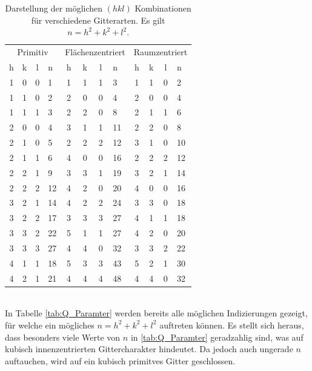 \documentclass[a4paper,twoside,final]{article}
\begin{document}
\begin{table}[ht]
	\centering
	\caption{Darstellung der möglichen $(hkl)$ Kombinationen für verschiedene Gitterarten. Es gilt $n = h^2+k^2+l^2$.}
	\label{tab:Indizierung}
	\begin{tabular}{c c c l c c c l c c c l}
		\toprule
      \multicolumn{4}{c}{Primitiv} & \multicolumn{4}{c}{Flächenzentriert} & \multicolumn{4}{c}{Raumzentriert}\\
      \cmidrule(lr){1-4}\cmidrule(lr){5-8}\cmidrule(lr){9-12}
      h & k & l & n & h & k & l & n & h & k & l & n \\
      \midrule
      1 & 0 & 0 & 1   & 1 & 1 & 1 & 3   & 1 & 1 & 0 & 2   \\
      1 & 1 & 0 & 2   & 2 & 0 & 0 & 4   & 2 & 0 & 0 & 4   \\
      1 & 1 & 1 & 3   & 2 & 2 & 0 & 8   & 2 & 1 & 1 & 6   \\
      2 & 0 & 0 & 4   & 3 & 1 & 1 & 11  & 2 & 2 & 0 & 8   \\
      2 & 1 & 0 & 5   & 2 & 2 & 2 & 12  & 3 & 1 & 0 & 10  \\
      2 & 1 & 1 & 6   & 4 & 0 & 0 & 16  & 2 & 2 & 2 & 12  \\
      2 & 2 & 1 & 9   & 3 & 3 & 1 & 19  & 3 & 2 & 1 & 14  \\
      2 & 2 & 2 & 12  & 4 & 2 & 0 & 20  & 4 & 0 & 0 & 16  \\
      3 & 2 & 1 & 14  & 4 & 2 & 2 & 24  & 3 & 3 & 0 & 18  \\
      3 & 2 & 2 & 17  & 3 & 3 & 3 & 27  & 4 & 1 & 1 & 18  \\
      3 & 3 & 2 & 22  & 5 & 1 & 1 & 27  & 4 & 2 & 0 & 20  \\
      3 & 3 & 3 & 27  & 4 & 4 & 0 & 32  & 3 & 3 & 2 & 22  \\
      4 & 1 & 1 & 18  & 5 & 3 & 3 & 43  & 5 & 2 & 1 & 30  \\
      4 & 2 & 1 & 21  & 4 & 4 & 4 & 48  & 4 & 4 & 0 & 32
	\end{tabular}
\end{table}\\
In Tabelle \ref{tab:Q_Paramter} werden bereits alle möglichen Indizierungen gezeigt, für welche ein mögliches $n = h^2+ k^2 +l^2$ auftreten können. Es stellt sich heraus, dass besonders viele Werte von $n$ in \ref{tab:Q_Paramter} geradzahlig sind, was auf kubisch innenzentrierten Gittercharakter hindeutet. Da jedoch auch ungerade $n$ auftauchen, wird auf ein kubisch primitves Gitter geschlossen.\\
\end{document}
